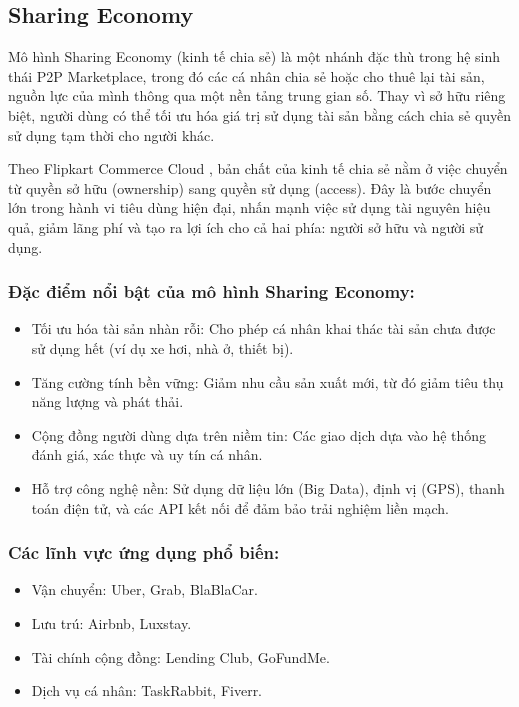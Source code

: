 \subsection{Sharing Economy }
Mô hình Sharing Economy (kinh tế chia sẻ) là một nhánh đặc thù trong hệ sinh thái P2P Marketplace, trong đó các cá nhân chia sẻ hoặc cho thuê lại tài sản, nguồn lực của mình thông qua một nền tảng trung gian số. Thay vì sở hữu riêng biệt, người dùng có thể tối ưu hóa giá trị sử dụng tài sản bằng cách chia sẻ quyền sử dụng tạm thời cho người khác.

Theo Flipkart Commerce Cloud \cite{flipkartCCC2025}, bản chất của kinh tế chia sẻ nằm ở việc chuyển từ quyền sở hữu (ownership) sang quyền sử dụng (access). Đây là bước chuyển lớn trong hành vi tiêu dùng hiện đại, nhấn mạnh việc sử dụng tài nguyên hiệu quả, giảm lãng phí và tạo ra lợi ích cho cả hai phía: người sở hữu và người sử dụng.

\subsubsection*{Đặc điểm nổi bật của mô hình Sharing Economy:}
\begin{itemize}
    \item Tối ưu hóa tài sản nhàn rỗi: Cho phép cá nhân khai thác tài sản chưa được sử dụng hết (ví dụ xe hơi, nhà ở, thiết bị).
    \item Tăng cường tính bền vững: Giảm nhu cầu sản xuất mới, từ đó giảm tiêu thụ năng lượng và phát thải.
    \item Cộng đồng người dùng dựa trên niềm tin: Các giao dịch dựa vào hệ thống đánh giá, xác thực và uy tín cá nhân.
    \item Hỗ trợ công nghệ nền: Sử dụng dữ liệu lớn (Big Data), định vị (GPS), thanh toán điện tử, và các API kết nối để đảm bảo trải nghiệm liền mạch.
\end{itemize}

\subsubsection*{Các lĩnh vực ứng dụng phổ biến:}
\begin{itemize}
    \item Vận chuyển: Uber, Grab, BlaBlaCar.
    \item Lưu trú: Airbnb, Luxstay.
    \item Tài chính cộng đồng: Lending Club, GoFundMe.
    \item Dịch vụ cá nhân: TaskRabbit, Fiverr.
\end{itemize}
